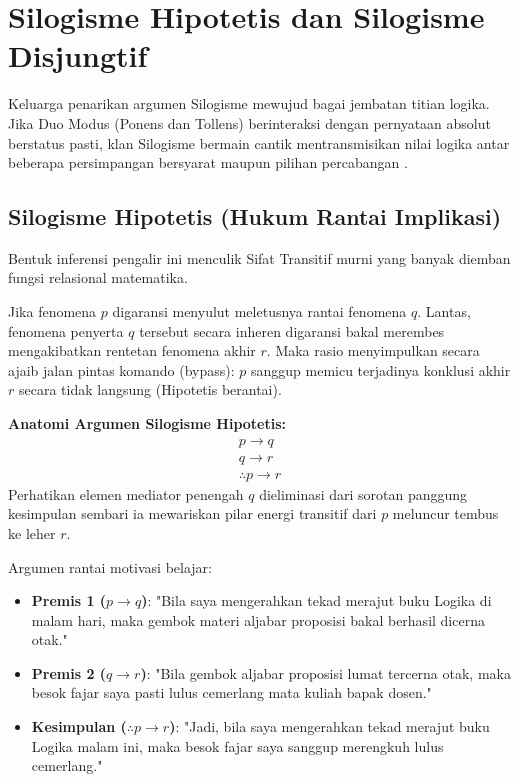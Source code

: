 \section{Silogisme Hipotetis dan Silogisme Disjungtif}

Keluarga penarikan argumen Silogisme mewujud bagai jembatan titian logika. Jika Duo Modus (Ponens dan Tollens) berinteraksi dengan pernyataan absolut berstatus pasti, klan Silogisme bermain cantik mentransmisikan nilai logika antar beberapa persimpangan bersyarat maupun pilihan percabangan \cite{rosen2019}.

\subsection{Silogisme Hipotetis (Hukum Rantai Implikasi)}

Bentuk inferensi pengalir ini menculik Sifat Transitif murni yang banyak diemban fungsi relasional matematika. 

\begin{teorema}
Jika fenomena $p$ digaransi menyulut meletusnya rantai fenomena $q$. Lantas, fenomena penyerta $q$ tersebut secara inheren digaransi bakal merembes mengakibatkan rentetan fenomena akhir $r$. Maka rasio menyimpulkan secara ajaib jalan pintas komando (bypass): $p$ sanggup memicu terjadinya konklusi akhir $r$ secara tidak langsung (Hipotetis berantai).
\end{teorema}

\textbf{Anatomi Argumen Silogisme Hipotetis:}
\[
\begin{array}{c}
p \rightarrow q \\
q \rightarrow r \\
\hline
\therefore p \rightarrow r
\end{array}
\]
Perhatikan elemen mediator penengah $q$ dieliminasi dari sorotan panggung kesimpulan sembari ia mewariskan pilar energi transitif dari $p$ meluncur tembus ke leher $r$.

\begin{contoh}
Argumen rantai motivasi belajar:
\begin{itemize}
    \item \textbf{Premis 1 ($p \rightarrow q$)}: "Bila saya mengerahkan tekad merajut buku Logika di malam hari, maka gembok materi aljabar proposisi bakal berhasil dicerna otak."
    \item \textbf{Premis 2 ($q \rightarrow r$)}: "Bila gembok aljabar proposisi lumat tercerna otak, maka besok fajar saya pasti lulus cemerlang mata kuliah bapak dosen."
    \item \textbf{Kesimpulan ($\therefore p \rightarrow r$)}: "Jadi, bila saya mengerahkan tekad merajut buku Logika malam ini, maka besok fajar saya sanggup merengkuh lulus cemerlang."
\end{itemize}
\end{contoh}

